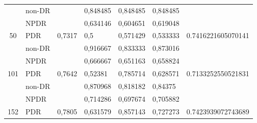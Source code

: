 \begin{table}[hbtp]
\begin{center}
\begin{tabular}{|c|l|c|l|l|l|c|}
			& non-DR                                             &                          & 0,848485                                          & 0,848485                                         & 0,848485                                        &                                      \\ \cline{2-2} \cline{4-6}
			& NPDR                                               &                          & 0,634146                                          & 0,604651                                         & 0,619048                                        &                                      \\ \cline{2-2} \cline{4-6}
			\multirow{-3}{*}{50}  & PDR                                                & \multirow{-3}{*}{0,7317} & 0,5                                               & 0,571429                                         & 0,533333                                        & \multirow{-3}{*}{0.7416221605070141} \\ \hline
			& non-DR                                             &                          & 0,916667                                          & 0,833333                                         & 0,873016                                        &                                      \\ \cline{2-2} \cline{4-6}
			& NPDR                                               &                          & 0,666667                                          & 0,651163                                         & 0,658824                                        &                                      \\ \cline{2-2} \cline{4-6}
			\multirow{-3}{*}{101} & PDR                                                & \multirow{-3}{*}{0,7642} & 0,52381                                           & 0,785714                                         & 0,628571                                        & \multirow{-3}{*}{0.7133252550521831} \\ \hline
			& non-DR                                             &                          & 0,870968                                          & 0,818182                                         & 0,84375                                         &                                      \\ \cline{2-2} \cline{4-6}
			& NPDR                                               &                          & 0,714286                                          & 0,697674                                         & 0,705882                                        &                                      \\ \cline{2-2} \cline{4-6}
			\multirow{-3}{*}{152} & PDR                                                & \multirow{-3}{*}{0,7805} & 0,631579                                          & 0,857143                                         & 0,727273                                        & \multirow{-3}{*}{0.7423939072743689} \\ \hline
		\end{tabular}
	\end{center}
\end{table}

